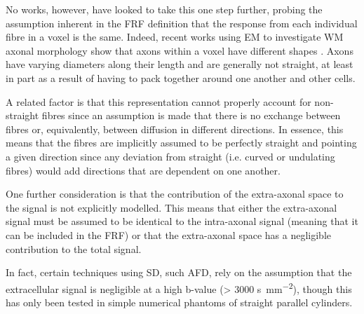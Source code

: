 No works, however, have looked to take this one step further, probing the assumption inherent in the \ac{FRF} definition that the response from each individual fibre in a voxel is the same.
Indeed, recent works using \ac{EM} to investigate \ac{WM} axonal morphology show that axons within a voxel have different shapes \cite{Lee2019b,Abdollahzadeh2019}. Axons have varying diameters along their length and are generally not straight, at least in part as a result of having to pack together around one another and other cells.

A related factor is that this representation cannot properly account for non-straight fibres since an assumption is made that there is no exchange between fibres or, equivalently, between diffusion in different directions. In essence, this means that the fibres are implicitly assumed to be perfectly straight and pointing a given direction since any deviation from straight (i.e. curved or undulating fibres) would add directions that are dependent on one another.

One further consideration is that the contribution of the extra-axonal space to the signal is not explicitly modelled. This means that either the extra-axonal signal must be assumed to be identical to the intra-axonal signal (meaning that it can be included in the \ac{FRF}) or that the extra-axonal space has a negligible contribution to the total signal.

In fact, certain techniques using \ac{SD}, such \ac{AFD}, rely on the assumption that the extracellular signal is negligible at a high b-value (> 3000 \si{\second\per\milli\metre\squared}), though this has only been tested in simple numerical phantoms of straight parallel cylinders. 


